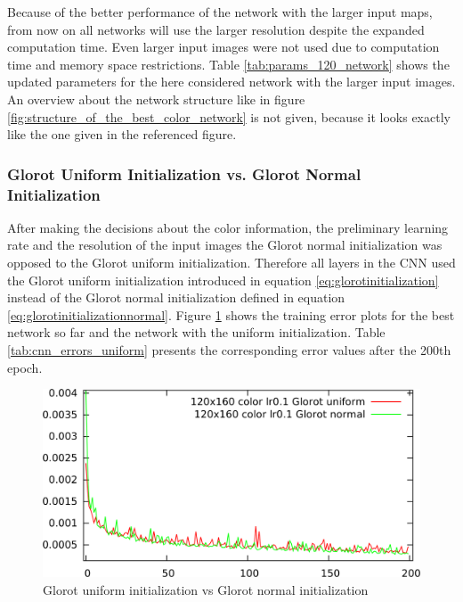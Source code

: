 \documentclass[11pt, a4paper]{article}
\begin{document}


Because of the better performance of the network with the larger input maps, from now on all networks will use the larger resolution despite the expanded computation time. Even larger input images were not used due to computation time and memory space restrictions. Table \ref{tab:params_120_network} shows the updated parameters for the here considered network with the larger input images. An overview about the network structure like in figure \ref{fig:structure_of_the_best_color_network} is not given, because it looks exactly like the one given in the referenced figure.



\subsubsection{Glorot Uniform Initialization vs. Glorot Normal Initialization}

After making the decisions about the color information, the preliminary learning rate and the resolution of the input images the Glorot normal initialization was opposed to the Glorot uniform initialization. Therefore all layers in the \ac{CNN} used the Glorot uniform initialization introduced in equation \eqref{eq:glorotinitialization} instead of the Glorot normal initialization defined in equation \eqref{eq:glorotinitializationnormal}. Figure \ref{fig:cnn_normal_vs_uniform} shows the training error plots for the best network so far and the network with the uniform initialization. Table \ref{tab:cnn_errors_uniform} presents the corresponding error values after the 200th epoch.

\begin{figure}[h!]
	\centering
	\includegraphics[width=\textwidth]{results/cnn_normal_vs_uniform.png}
	\caption{Glorot uniform initialization vs Glorot normal initialization}
	\label{fig:cnn_normal_vs_uniform}
\end{figure}
\end{document}
